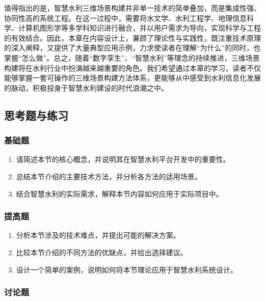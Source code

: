 值得指出的是，智慧水利三维场景构建并非单一技术的简单叠加，而是集成性强、协同性高的系统工程。在这一过程中，需要将水文学、水利工程学、地理信息科学、计算机图形学等多学科知识进行融合，并以用户需求为导向，实现科学与工程的有效结合。因此，本章在内容设计上，兼顾了理论性与实践性，既注重技术原理的深入阐释，又提供了大量典型应用示例，力求使读者在理解``为什么''的同时，也掌握``怎么做''。总之，随着``数字孪生''、``智慧水利''等理念的持续推进，三维场景构建将在水利行业中扮演越来越重要的角色。我们希望通过本章的学习，读者不仅能够掌握一套可操作的三维场景构建方法体系，更能够从中感受到水利信息化发展的脉动，积极投身于智慧水利建设的时代浪潮之中。

\subsection{思考题与练习}\label{ux601dux8003ux9898ux4e0eux7ec3ux4e60-1}

\subsubsection{基础题}\label{ux57faux7840ux9898-1}

\begin{enumerate}
\def\labelenumi{\arabic{enumi}.}
\tightlist
\item
  请简述本节的核心概念，并说明其在智慧水利平台开发中的重要性。
\item
  总结本节介绍的主要技术方法，并分析各方法的适用场景。
\item
  结合智慧水利的实际需求，解释本节内容如何应用于实际项目中。
\end{enumerate}

\subsubsection{提高题}\label{ux63d0ux9ad8ux9898-1}

\begin{enumerate}
\def\labelenumi{\arabic{enumi}.}
\setcounter{enumi}{3}
\tightlist
\item
  分析本节涉及的技术难点，并提出可能的解决方案。
\item
  比较本节介绍的不同方法的优缺点，并给出选择建议。
\item
  设计一个简单的案例，说明如何将本节理论应用于智慧水利系统设计。
\end{enumerate}

\subsubsection{讨论题}\label{ux8ba8ux8bbaux9898-1}

